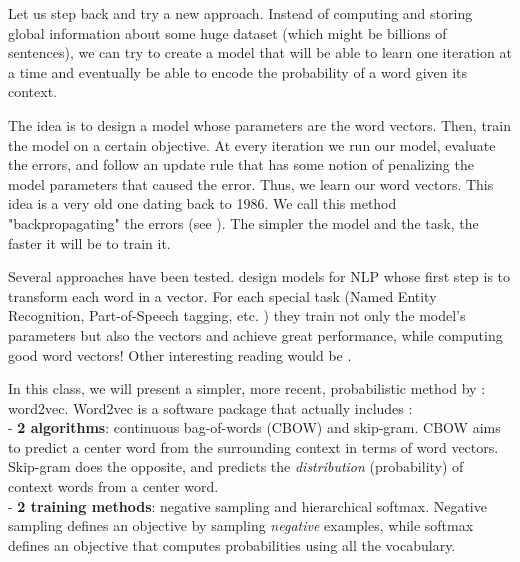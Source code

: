 \documentclass[nobib]{tufte-handout}
\begin{document}
Let us step back and try a new approach. Instead of computing and storing global information about some huge dataset (which might be billions of sentences), we can try to create a model that will be able to learn one iteration at a time and eventually be able to encode the probability of a word given its context. 

The idea is to design a model whose parameters are the word vectors. Then, train the model on a certain objective. At every iteration we run our model, evaluate the errors, and follow an update rule that has some notion of penalizing the model parameters that caused the error. Thus, we learn our word vectors. This idea is a very old one dating back to 1986. We call this method "backpropagating" the errors (see \cite{Rumelhart:1988:LRB:65669.104451}). The simpler the model and the task, the faster it will be to train it.


Several approaches have been tested. \cite{DBLP:journals/corr/abs-1103-0398} design models for NLP whose first step is to transform each word in a vector. For each special task (Named Entity Recognition, Part-of-Speech tagging, etc. ) they train not only the model's parameters but also the vectors and achieve great performance, while computing good word vectors! Other interesting reading would be \cite{Bengio:2003:NPL:944919.944966}.



In this class, we will present a simpler, more recent, probabilistic method by \cite{DBLP:journals/corr/abs-1301-3781} : word2vec. Word2vec is a software package that actually includes :\\
- \textbf{2 algorithms}: continuous bag-of-words (CBOW) and skip-gram. CBOW aims to predict a center word from the surrounding context in terms of word vectors. Skip-gram does the opposite, and predicts the \emph{distribution} (probability) of context words from a center word.\\
- \textbf{2 training methods}: negative sampling and hierarchical softmax. Negative sampling defines an objective by sampling \emph{negative} examples, while softmax defines an objective that computes probabilities using all the vocabulary.
\end{document}
